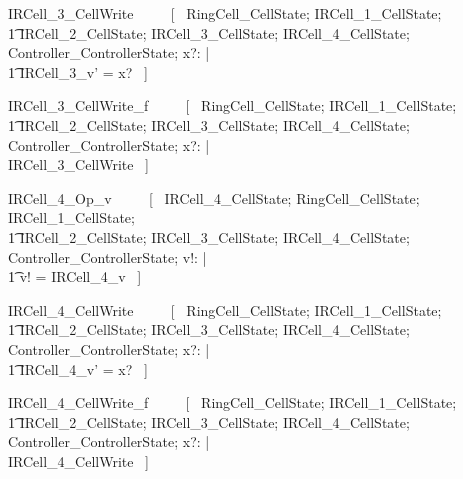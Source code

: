 \documentclass{article}
\begin{document}
\begin{zed}
IRCell\_3\_CellWrite ~~~~ [~ 
    \Xi RingCell\_CellState; 
    \Xi IRCell\_1\_CellState; \\
    \t1 \Xi IRCell\_2\_CellState; 
    \Delta IRCell\_3\_CellState;
    \Xi IRCell\_4\_CellState; 
    \Xi Controller\_ControllerState; 
    x?: \nat | \\
    \t1 IRCell\_3\_v' = x? ~] \\
\end{zed}

\begin{zed}
IRCell\_3\_CellWrite\_f ~~~~ [~ 
    \Xi RingCell\_CellState; 
    \Xi IRCell\_1\_CellState; \\
    \t1 \Xi IRCell\_2\_CellState; 
    \Xi IRCell\_3\_CellState;
    \Xi IRCell\_4\_CellState; 
    \Xi Controller\_ControllerState; 
    x?: \nat | \\
    \lnot \pre IRCell\_3\_CellWrite ~] \\
\end{zed}
\begin{zed}
IRCell\_4\_Op\_v ~~~~ [~ 
    \Xi IRCell\_4\_CellState; 
    \Xi RingCell\_CellState; 
    \Xi IRCell\_1\_CellState; \\
    \t1 \Xi IRCell\_2\_CellState; 
    \Xi IRCell\_3\_CellState;
    \Xi IRCell\_4\_CellState; 
    \Xi Controller\_ControllerState; v!: \nat | \\
    \t1 v! = IRCell\_4\_v ~] \\
\end{zed}

\begin{zed}
IRCell\_4\_CellWrite ~~~~ [~ 
    \Xi RingCell\_CellState; 
    \Xi IRCell\_1\_CellState; \\
    \t1 \Xi IRCell\_2\_CellState; 
    \Xi IRCell\_3\_CellState; 
    \Delta IRCell\_4\_CellState;
    \Xi Controller\_ControllerState; 
    x?: \nat | \\
    \t1 IRCell\_4\_v' = x? ~] \\
\end{zed}

\begin{zed}
IRCell\_4\_CellWrite\_f ~~~~ [~ 
    \Xi RingCell\_CellState; 
    \Xi IRCell\_1\_CellState; \\
    \t1 \Xi IRCell\_2\_CellState; 
    \Xi IRCell\_3\_CellState;
    \Xi IRCell\_4\_CellState; 
    \Xi Controller\_ControllerState; 
    x?: \nat | \\
    \lnot \pre IRCell\_4\_CellWrite ~] \\
\end{zed}
\end{document}

